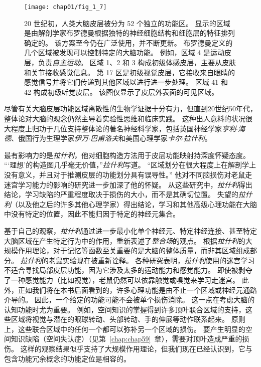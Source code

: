 \begin{figure}[htbp]
	\centering
	\texttt{[image: chap01/fig\_1\_7]}
	\caption{20 世纪初，人类大脑皮层被分为 52 个独立的功能区。
		显示的区域是由解剖学家布罗德曼根据独特的神经细胞结构和细胞层的特征排列确定的。
		该方案至今仍在广泛使用，并不断更新。
		布罗德曼定义的几个区域被发现可以控制特定的大脑功能。
		例如，区域 4 是运动皮层，负责\textit{自主运动}。
		区域 1、2 和 3 构成初级体感皮层，主要从皮肤和关节接收感觉信息。
		第 17 区是初级视觉皮层，它接收来自眼睛的感觉信号并将它们传递到其他区域以进行进一步处理。
		区域 41 和 42 构成初级听觉皮层。
		该图仅显示了皮层外表面的可见区域。}
	\label{fig:1_7}
\end{figure}

尽管有关大脑皮层功能区域离散性的生物学证据十分有力，但直到20世纪50年代，整体论对大脑的观念仍然主导着实验性思维和临床实践。
这种出人意料的状况很大程度上归功于几位支持整体论的著名神经科学家，包括英国神经学家\textit{亨利$\cdot$海德}、俄国行为生理学家\textit{伊万$\cdot$巴甫洛夫}和美国心理学家\textit{卡尔$\cdot$拉什利}。



最有影响力的是\textit{拉什利}，他对细胞构造方法用于皮层功能映射持深度怀疑态度。
“‘理想’的构造图几乎毫无价值，”\textit{拉什利}写道。
“区域划分在很大程度上在解剖学上没有意义，并且对于推测皮层的功能划分具有误导性。” 
他对不同脑损伤对老鼠走迷宫学习能力的影响的研究进一步加深了他的怀疑。
从这些研究中，\textit{拉什利}得出结论，学习缺陷的严重程度取决于损伤的大小，而不是其确切位置。
失望的\textit{拉什利}（以及他之后的许多其他心理学家）得出结论，学习和其他高级心理功能在大脑中没有特定的位置，因此不能归因于特定的神经元集合。




基于自己的观察，\textit{拉什利}通过进一步最小化单个神经元、特定神经连接、甚至特定大脑区域在产生特定行为中的作用，重新表述了\textit{整合场}的观点。
根据\textit{拉什利}的大规模作用理论，对于记忆等函数至关重要的是大脑的整体质量，而非其区域组成部分。
\textit{拉什利}的老鼠实验现在被重新诠释。
各种研究表明，\textit{拉什利}使用的迷宫学习不适合寻找局部皮层功能，因为它涉及太多的运动能力和感觉能力。
即使被剥夺了一种感觉能力（比如视觉），老鼠仍然可以依靠触觉或嗅觉来学习走迷宫。
此外，正如我们将在本书后面看到的，许多心理功能是由不止一个区域或神经元通路介导的。
因此，一个给定的功能可能不会被单个损伤消除。
这一点在考虑大脑的认知功能时尤为重要。
例如，空间知识的掌握得到许多顶叶联合区域的支持，这些区域将视觉与潜在的眼球转动、头部转动、手的伸展等动作联系起来。
原则上，这些联合区域中的任何一个都可以弥补另一个区域的损伤。
要产生明显的空间知识缺陷（空间失认症）（见第~\ref{chap:chap59}~章），需要对顶叶造成严重的损伤。
这样的观察结果似乎支持了大规模作用理论，但我们现在已经认识到，它与包含功能冗余概念的功能定位是相容的。


